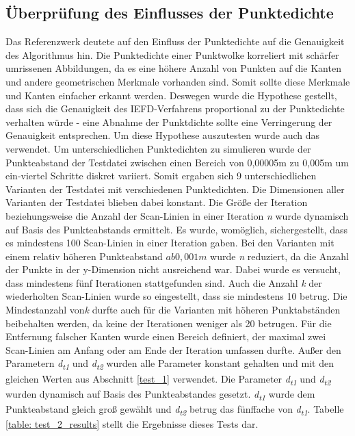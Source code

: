 \subsection{Überprüfung des Einflusses der Punktedichte} \label{test_2}
Das Referenzwerk deutete auf den Einfluss der Punktedichte auf die Genauigkeit des Algorithmus hin. Die Punktedichte einer Punktwolke korreliert mit schärfer umrissenen Abbildungen, da es eine höhere Anzahl von Punkten auf die Kanten und andere geometrischen Merkmale vorhanden sind. Somit sollte diese Merkmale und Kanten einfacher erkannt werden. Deswegen wurde die Hypothese gestellt, dass sich die Genauigkeit des IEFD-Verfahrens proportional zu der Punktedichte verhalten würde - eine Abnahme der Punktdichte sollte eine Verringerung der Genauigkeit entsprechen. Um diese Hypothese auszutesten wurde auch das \testcloud verwendet. Um unterschiedlichen Punktedichten zu simulieren wurde der Punkteabstand der Testdatei zwischen einen Bereich von 0,00005m zu 0,005m um ein-viertel Schritte diskret variiert. Somit ergaben sich 9 unterschiedlichen Varianten der Testdatei mit verschiedenen Punktedichten. Die Dimensionen aller Varianten der Testdatei blieben dabei konstant. Die Größe der Iteration beziehungsweise die Anzahl der Scan-Linien in einer Iteration \textit{n} wurde dynamisch auf Basis des Punkteabstands ermittelt. Es wurde, womöglich, sichergestellt, dass es mindestens 100 Scan-Linien in einer Iteration gaben. Bei den Varianten mit einem relativ höheren Punkteabstand \(ab 0,001m\) wurde \textit{n} reduziert, da die Anzahl der Punkte in der y-Dimension nicht ausreichend war. Dabei wurde es versucht, dass mindestens fünf Iterationen stattgefunden sind. Auch die Anzahl \textit{k} der wiederholten Scan-Linien wurde so eingestellt, dass sie mindestens 10 betrug. Die Mindestanzahl von\textit{k} durfte auch für die Varianten mit höheren Punktabständen beibehalten werden, da keine der Iterationen weniger als 20 betrugen. Für die Entfernung falscher Kanten wurde einen Bereich definiert, der maximal zwei Scan-Linien am Anfang oder am Ende der Iteration umfassen durfte. Außer den Parametern \textit{d\textsubscript{t1}} und \textit{d\textsubscript{t2}} wurden alle Parameter konstant gehalten und mit den gleichen Werten aus Abschnitt \ref{test_1} verwendet. Die Parameter \textit{d\textsubscript{t1}} und \textit{d\textsubscript{t2}} wurden dynamisch auf Basis des Punkteabstandes gesetzt. \textit{d\textsubscript{t1}} wurde dem Punkteabstand gleich groß gewählt und \textit{d\textsubscript{t2}} betrug das fünffache von \textit{d\textsubscript{t1}}. Tabelle \ref{table: test_2_results} stellt die Ergebnisse dieses Tests dar.

